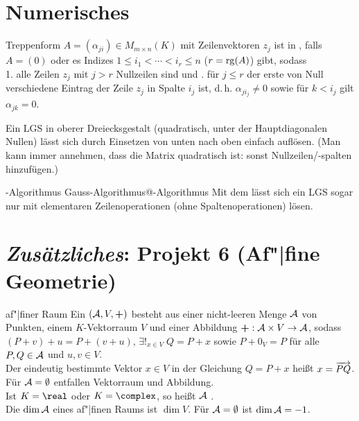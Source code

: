 \section{%
    Numerisches%
}

\begin{Def}{Treppenform}
    $A = (\alpha_{ji}) \in M_{m \times n}(K)$ mit Zeilenvektoren $z_j$ ist in
    , falls $A = (0)$ oder es Indizes
    $1 \le i_1 < \cdots < i_r \le n$ ($r = \operatorname{rg}(A)$) gibt, sodass \\
    1. alle Zeilen $z_j$ mit $j > r$ Nullzeilen sind und . für $j \le r$ der erste von Null verschiedene Eintrag der Zeile $z_j$
    in Spalte $i_j$ ist, d.\,h. $\alpha_{ji_{j}} \not= 0$ sowie für $k < i_j$
    gilt $\alpha_{jk} = 0$.
\end{Def}

\begin{Beobachtung}
    Ein LGS in oberer Dreiecksgestalt (quadratisch, unter der Hauptdiagonalen
    Nullen) lässt sich durch Einsetzen von unten nach oben einfach auflösen.
    (Man kann immer annehmen, dass die Matrix quadratisch ist:
    sonst Nullzeilen/-spalten hinzufügen.)
\end{Beobachtung}

\begin{xDef}{-Algorithmus}%
{Gauss-Algorithmus@-Algorithmus}
    Mit dem
    lässt sich ein LGS sogar nur mit elementaren Zeilenoperationen
    (ohne Spaltenoperationen) lösen.
\end{xDef}

\section{%
    \emph{Zusätzliches}: Projekt 6 (Af"|fine Geometrie)%
}

\begin{Def}{af"|finer Raum}
    Ein  $(\mathcal{A}, V, \boldsymbol{+})$ besteht aus
    einer nicht-leeren Menge $\mathcal{A}$ von Punkten, einem $K$-Vektorraum $V$
    und einer Abbildung
    $\boldsymbol{+}: \mathcal{A} \times V \rightarrow \mathcal{A}$,
    sodass $(P + v) + u = P + (v + u)$,
    $\exists!_{x \in V}\; Q = P + x$ sowie
    $P + 0_V = P$
    für alle $P, Q \in \mathcal{A}$ und $u, v \in V$. \\
    Der eindeutig bestimmte Vektor $x \in V$ in der Gleichung $Q = P + x$
    heißt $x = \overrightarrow{PQ}$. \\
    Für $\mathcal{A} = \emptyset$ entfallen Vektorraum und Abbildung. \\
    Ist $K = \real$ oder $K = \complex$, so heißt $\mathcal{A}$
    . \\
    Die  $\dim \mathcal{A}$ eines af"|finen Raums ist
    $\dim V$.
    Für $\mathcal{A} = \emptyset$ ist $\dim \mathcal{A} = -1$.
\end{Def}

